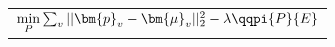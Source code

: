 \tiny
\begin{tabular}{@{}c@{}}
$\underset{P}{\mathrm{min}} \sum_v || \bm{p}_v - \bm{\mu}_v ||_2^2 -\lambda \qqpi{P}{E}$
\end{tabular}